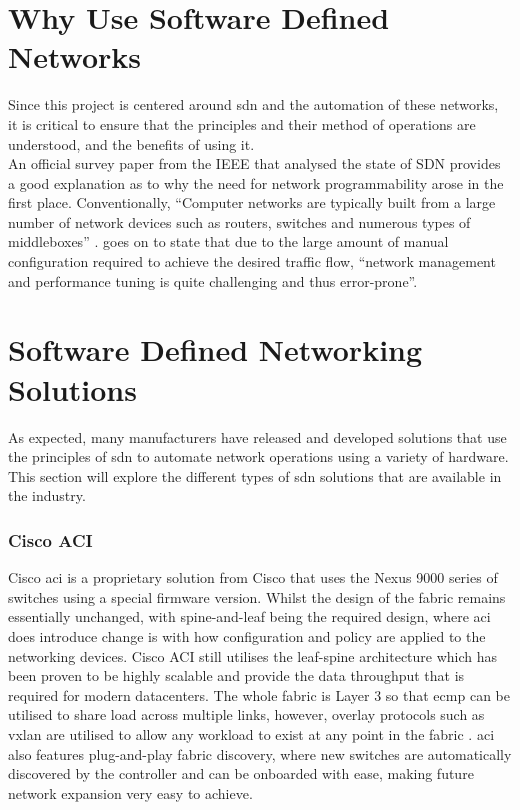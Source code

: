 \section{Why Use Software Defined Networks}
\label{litreview:overview}

Since this project is centered around \gls{sdn} and
the
automation of these networks, it is critical to ensure that the principles
and
their method of operations are understood, and the benefits of using it.\\
An official survey paper from the IEEE that analysed the state of SDN provides
a good explanation as to why the need for network programmability arose in the
first place. Conventionally, ``Computer networks are typically built from a
large number of network devices such as routers, switches and numerous types of
middleboxes'' \citep{1}. \citeauthor{1} goes on to state that due to the large
amount of manual configuration required to achieve the desired traffic flow,
“network management and performance tuning is quite challenging and thus
error-prone”.

\section{Software Defined Networking Solutions}
\label{litreview:types}
As expected, many manufacturers have released and
developed solutions that use the principles of \gls{sdn} to automate network
operations using a variety of hardware. This section will explore the different
types of \gls{sdn} solutions that are available in the industry.

\subsubsection{Cisco ACI}
Cisco \gls{aci} is a proprietary solution from Cisco
that uses the Nexus 9000 series of switches using a special firmware version.
Whilst the design of the fabric remains essentially unchanged, with
spine-and-leaf being the required design, where \gls{aci} does introduce change
is with how configuration and policy are applied to the networking devices.
Cisco ACI still utilises the leaf-spine architecture which has been proven to
be highly scalable and provide the data throughput that is required for modern
datacenters. The whole fabric is Layer 3 so that \gls{ecmp} can be utilised to
share load across multiple links, however, overlay protocols such as
\gls{vxlan} are utilised to allow any workload to exist at any point in the
fabric \citep{duffy2014cisco}.
\gls{aci} also features plug-and-play fabric
discovery, where new switches are automatically discovered by the controller
and can be onboarded with ease, making future network expansion very easy to
achieve.

